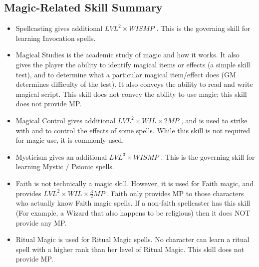 \documentclass[twoside]{book}
\begin{document}
    

\subsection{Magic-Related Skill Summary}
    
\begin{itemize}
      
  \item   Spellcasting gives additional \ensuremath{    
                    { LVL }^{ 2 }   \ensuremath{\times}  WIS  MP
                          } . This is the governing skill
                      for learning Invocation spells.
              
  \item   Magical Studies is the academic study of magic
                 and how it works. It also gives the player the ability
                 to identify magical items or effects (a simple skill
                 test), and to determine what a particular magical
                 item/effect does (GM determines difficulty of the test).
                 It also conveys the ability to read and write magical
                 script. This skill does not convey the ability to use
                 magic; this skill does not provide MP. 
  \item   Magical Control gives additional \ensuremath{    
                    { LVL }^{ 2 }   \ensuremath{\times}    WIL   
                      \ensuremath{\times}    2    MP   
                       } , and is used to strike with and to control
                      the effects of some spells. While this skill is not
                      required for magic use, it is commonly used.
              
  \item   Mysticism gives an additional \ensuremath{    
                    { LVL }^{ 3 }   \ensuremath{\times}    WIS    MP
                          } . This is the governing skill
                      for learning Mystic / Psionic spells.
              
  \item   Faith is not technically a magic skill. However,
                 it is used for Faith magic, and provides \ensuremath{  
                    { LVL }^{ 2 }   \ensuremath{\times}    WIL   
                      \ensuremath{\times}   \frac{ 3 }{ 2
                      }   MP     } . Faith
                      only provides MP to those characters who actually
                      know Faith magic spells. If a non-faith spellcaster
                      has this skill (For example, a Wizard that also
                      happens to be religious) then it does NOT provide
                      any MP.
              
  \item   Ritual Magic is used for Ritual Magic spells. No
                 character can learn a ritual spell with a higher rank
                 than her level of Ritual Magic. This skill does not
                 provide MP. 
\end{itemize}
\end{document}
